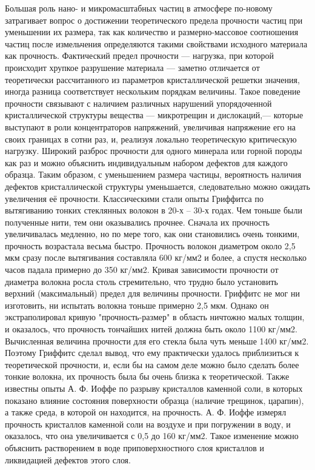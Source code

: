 Большая роль нано- и микромасштабных частиц в атмосфере по-новому затрагивает вопрос о достижении теоретического предела прочности частиц при уменьшении их размера, так как количество и размерно-массовое соотношения частиц после измельчения определяются такими свойствами исходного материала как прочность. Фактический предел прочности — нагрузка, при которой происходит хрупкое разрушение материала — заметно отличается от теоретически рассчитанного из параметров кристаллической решетки значения, иногда разница соответствует нескольким порядкам величины. Такое поведение прочности связывают с наличием различных нарушений упорядоченной кристаллической структуры вещества —  микротрещин и дислокаций,— которые выступают в роли концентраторов напряжений, увеличивая напряжение его на своих границах в сотни раз, и, реализуя локально теоретическую критическую нагрузку. Широкий разброс прочности для одного минерала или горной породы как раз и можно объяснить индивидуальным набором дефектов для каждого образца.
Таким образом, с уменьшением размера частицы, вероятность наличия дефектов кристаллической структуры уменьшается, следовательно можно ожидать увеличения её прочности. 
Классическими стали опыты Гриффитса по вытягиванию тонких стеклянных волокон в 20-х – 30-х годах. Чем тоньше были полученные нити, тем они оказывались прочнее. Сначала их прочность увеличивалась медленно, но по мере того, как они становились очень тонкими, прочность возрастала весьма быстро. Прочность волокон диаметром около 2,5 мкм сразу после вытягивания составляла 600 кг/мм2 и более, а спустя несколько часов падала примерно до 350 кг/мм2. Кривая зависимости прочности от диаметра волокна росла столь стремительно, что трудно было установить верхний (максимальный) предел для величины прочности.
Гриффитс не мог ни изготовить, ни испытать волокна тоньше примерно 2,5 мкм. Однако он экстраполировал кривую "прочность-размер" в область ничтожно малых толщин, и оказалось, что прочность тончайших нитей должна быть около 1100 кг/мм2. Вычисленная величина прочности для его стекла была чуть меньше 1400 кг/мм2. Поэтому Гриффитс сделал вывод, что ему практически удалось приблизиться к теоретической прочности, и, если бы на самом деле можно было сделать более тонкие волокна, их прочность была бы очень близка к теоретической.
Также известны опыты А. Ф. Иоффе по разрыву кристаллов каменной соли, в которых показано влияние состояния поверхности образца (наличие трещинок, царапин), а также среда, в которой он находится, на прочность. А. Ф. Иоффе измерял прочность кристаллов каменной соли на воздухе и при погружении в воду, и оказалось, что она увеличивается с 0,5 до 160 кг/мм2. Такое изменение можно объяснить растворением в воде приповерхностного слоя кристаллов и ликвидацией дефектов этого слоя.
